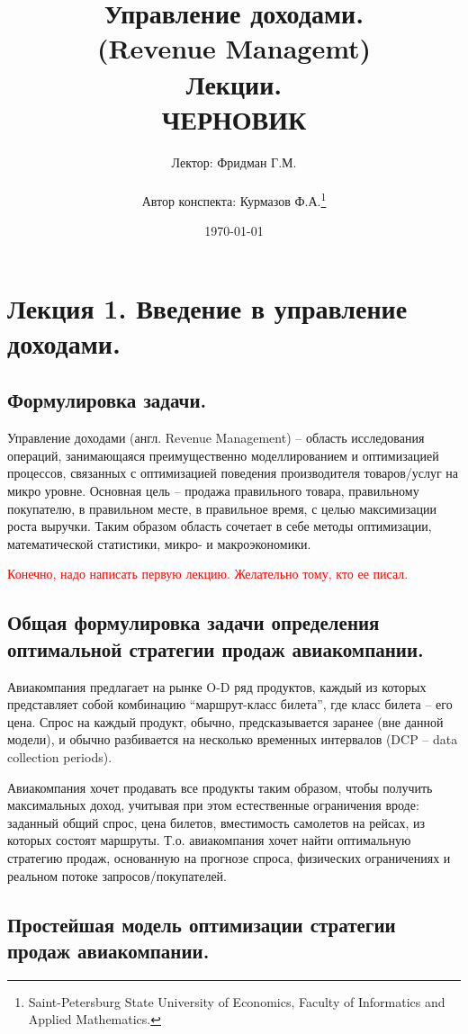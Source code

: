 \documentclass[reqno]{article}
\title{Управление доходами.\\ (Revenue Managemt)\\ Лекции.\\ ЧЕРНОВИК}
\author{Лектор: Фридман Г.М.\\  \\ Автор конспекта: Курмазов Ф.А.\thanks{Saint-Petersburg State University of Economics, Faculty of Informatics and Applied Mathematics.}}
\date{\today}
\theoremstyle{definition}
\theoremstyle{definition}
\theoremstyle{definition}
\theoremstyle{definition}
\theoremstyle{definition}
\theoremstyle{definition}
\theoremstyle{definition}
\theoremstyle{definition}
\theoremstyle{definition}
\begin{document}
	\maketitle

	\tableofcontents


	\newpage
	\section{Лекция 1. Введение в управление доходами.}
		\subsection{Формулировка задачи.}
			
		Управление доходами (англ. Revenue Management) -- область исследования операций, занимающаяся преимущественно моделлированием и оптимизацией процессов, связанных с оптимизацией поведения производителя товаров/услуг на микро уровне. Основная цель -- продажа правильного товара, правильному покупателю, в правильном месте, в правильное время, с целью максимизации роста выручки. Таким образом область сочетает в себе методы оптимизации, математической статистики, микро- и макроэкономики.
		
		\textcolor{red}{Конечно, надо написать первую лекцию. Желательно тому, кто ее писал.}
		
		\subsection{Общая формулировка задачи определения оптимальной стратегии продаж авиакомпании.}
			Авиакомпания предлагает на рынке O-D ряд продуктов, каждый из которых представляет собой комбинацию ``маршрут-класс билета'', где класс билета -- его цена. Спрос на каждый продукт, обычно, предсказывается заранее (вне данной модели), и обычно разбивается на несколько временных интервалов (DCP -- data collection periods).
			
			Авиакомпания хочет продавать все продукты таким образом, чтобы получить максимальных доход, учитывая при этом естественные ограничения вроде: заданный общий спрос, цена билетов, вместимость самолетов на рейсах, из которых состоят маршруты. Т.о. авиакомпания хочет найти оптимальную стратегию продаж, основанную на прогнозе спроса, физических ограничениях и реальном потоке запросов/покупателей.
		
		\subsection{Простейшая модель оптимизации стратегии продаж авиакомпании.}
	
\end{document}
